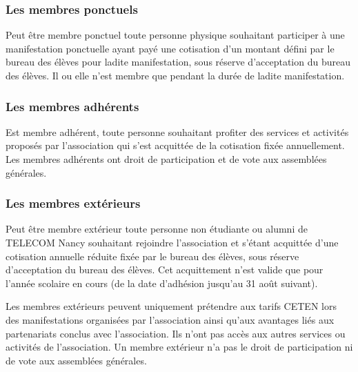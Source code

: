 \documentclass{article}
\begin{document}
			\subsubsection{Les membres ponctuels}
				Peut être membre ponctuel toute personne physique souhaitant
				participer à une manifestation ponctuelle ayant payé une
				cotisation d’un montant défini par le bureau des élèves pour
				ladite manifestation, sous réserve d’acceptation du bureau des
				élèves. Il ou elle n’est membre que pendant la durée de ladite
				manifestation.

			\subsubsection{Les membres adhérents}
				Est membre adhérent, toute personne souhaitant profiter des
				services et activités proposés par l’association qui s’est
				acquittée de la cotisation fixée annuellement. Les membres
				adhérents ont droit de participation et de vote aux assemblées
				générales.

			\subsubsection{Les membres extérieurs}
				Peut être membre extérieur toute personne non étudiante ou
				alumni de TELECOM Nancy souhaitant rejoindre l’association et
				s'étant acquittée d’une cotisation annuelle réduite fixée par le
				bureau des élèves, sous réserve d'acceptation du bureau des
				élèves. Cet acquittement n’est valide que pour l’année scolaire
				en cours (de la date d’adhésion jusqu’au 31 août suivant).

				Les membres extérieurs peuvent uniquement prétendre aux tarifs
				CETEN lors des manifestations organisées par l’association ainsi
				qu’aux avantages liés aux partenariats conclus avec
				l’association. Ils n’ont pas accès aux autres services ou
				activités de l’association. Un membre extérieur n’a pas le droit
				de participation ni de vote aux assemblées générales.
\end{document}
